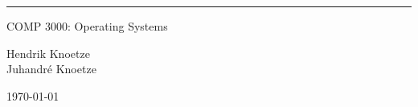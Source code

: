 \documentclass[12pt,letterpaper]{article}
\begin{document}
\renewcommand\headrule{}

\pagestyle{fancy}
\fancyhf{}
\rfoot{\thepage/\pageref{LastPage}}

\thispagestyle{empty}


\begin{center}
\end{center}

\vfill

\begin{center}
	{\Huge <Insert title here>}
	\vspace{0.5em}\rule{\textwidth}{0.5pt}
	COMP 3000: Operating Systems
\end{center}

\vspace{1em}

\begin{center}
    Hendrik Knoetze\\
    Juhandr\'e Knoetze
\end{center}

\vfill

\begin{center}
	\today
\end{center}

\newpage{}

\tableofcontents{}



\newpage{}







\end{document}
